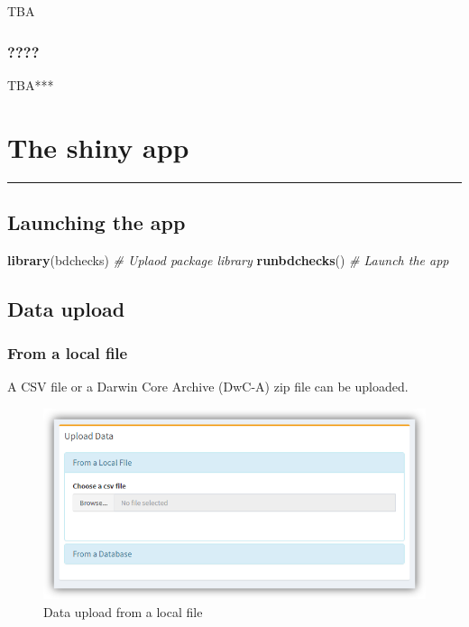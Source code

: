 \documentclass[]{book}
\newenvironment{Shaded}{\begin{snugshade}}{\end{snugshade}}
\newcommand{\KeywordTok}[1]{\textcolor[rgb]{0.13,0.29,0.53}{\textbf{#1}}}
\newcommand{\CommentTok}[1]{\textcolor[rgb]{0.56,0.35,0.01}{\textit{#1}}}
\newcommand{\NormalTok}[1]{#1}
\theoremstyle{definition}
\theoremstyle{definition}
\theoremstyle{definition}
\theoremstyle{remark}
\begin{document}
TBA

\subsection{????}\label{section-1}

TBA***

\hypertarget{the-shiny-app}{\chapter{The shiny
app}\label{the-shiny-app}}

\begin{center}\rule{0.5\linewidth}{\linethickness}\end{center}

\section{Launching the app}\label{launching-the-app}

\begin{Shaded}
\begin{Highlighting}[]
\KeywordTok{library}\NormalTok{(bdchecks) }\CommentTok{# Uplaod package library}
\KeywordTok{runbdchecks}\NormalTok{() }\CommentTok{# Launch the app}
\end{Highlighting}
\end{Shaded}

\section{Data upload}\label{data-upload}

\subsection{From a local file}\label{from-a-local-file}

A CSV file or a Darwin Core Archive (DwC-A) zip file can be uploaded.

\begin{figure}
\centering
\includegraphics{img/bdchecks_Up-local_file.png}
\caption{Data upload from a local file}
\end{figure}
\end{document}
